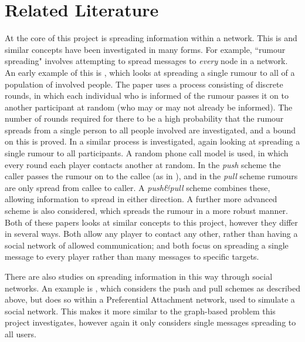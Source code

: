 \documentclass[bsc,frontabs,twoside,singlespacing,parskip,deptreport]{infthesis}     %
\begin{document}
\section{Related Literature}
At the core of this project is spreading information within a network. This is and similar concepts have been investigated in many forms. For example, ``rumour spreading" involves attempting to spread messages to \textit{every} node in a network. An early example of this is \cite{Pittel87}, which looks at spreading a single rumour to all of a population of involved people. The paper uses a process consisting of discrete rounds, in which each individual who is informed of the rumour passes it on to another participant at random (who may or may not already be informed). The number of rounds required for there to be a high probability that the rumour spreads from a single person to all people involved are investigated, and a bound on this is proved. In \cite{KarpSSV00} a similar process is investigated, again looking at spreading a single rumour to all participants. A random phone call model is used, in which every round each player contacts another at random. In the \textit{push} scheme the caller passes the rumour on to the callee (as in \cite{Pittel87}), and in the \textit{pull} scheme rumours are only spread from callee to caller. A \textit{push\&pull} scheme combines these, allowing information to spread in either direction. A further more advanced scheme is also considered, which spreads the rumour in a more robust manner. Both of these papers looks at similar concepts to this project, however they differ in several ways. Both allow any player to contact any other, rather than having a social network of allowed communication; and both focus on spreading a single message to every player rather than many messages to specific targets.

There are also studies on spreading information in this way through social networks. An example is \cite{SocialNetworkRumours}, which considers the push and pull schemes as described above, but does so within a Preferential Attachment network, used to simulate a social network. This makes it more similar to the graph-based problem this project investigates, however again it only considers single messages spreading to all users.
\end{document}
